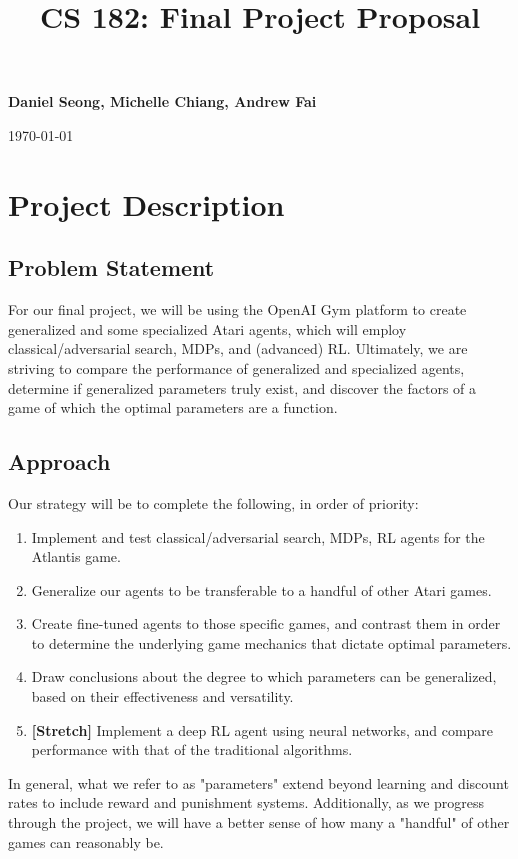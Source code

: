 \documentclass{NSF}
\begin{document}

\title{CS 182: Final Project Proposal}
\begin{center}
	{\bf \large Daniel Seong, Michelle Chiang, Andrew Fai}

	\today
\end{center}

\section{Project Description}

\subsection{Problem Statement}
For our final project, we will be using the OpenAI Gym platform to create generalized and some specialized Atari agents, which will employ classical/adversarial search, MDPs, and (advanced) RL. Ultimately, we are striving to compare the performance of generalized and specialized agents, determine if generalized parameters truly exist, and discover the factors of a game of which the optimal parameters are a function.

\subsection{Approach}
Our strategy will be to complete the following, in order of priority:
\begin{enumerate}
\item Implement and test classical/adversarial search, MDPs, RL agents for the Atlantis game.
\item Generalize our agents to be transferable to a handful of other Atari games.
\item Create fine-tuned agents to those specific games, and contrast them in order to determine the underlying game mechanics that dictate optimal parameters.
\item Draw conclusions about the degree to which parameters can be generalized, based on their effectiveness and versatility.
\item \textbf{[Stretch]} Implement a deep RL agent using neural networks, and compare performance with that of the traditional algorithms.
\end{enumerate}
In general, what we refer to as "parameters" extend beyond learning and discount rates to include reward and punishment systems. Additionally, as we progress through the project, we will have a better sense of how many a "handful" of other games can reasonably be.
\end{document}
